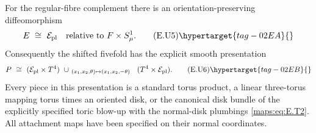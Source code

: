 \begin{proposition}
For the regular-fibre complement there is an
orientation-preserving diffeomorphism
\[
                  E\ \cong\ \mathcal E_{\rm pl}
                 \quad\hbox{relative to }F\times S^1_\mu .
 \tag{E.U5}\hypertarget{tag-02EA}{}\label{maps:eq:E.U5}
\]
Consequently the shifted fivefold has the explicit smooth
presentation
\[
 P\ \cong\
 (\mathcal E_{\rm pl}\times T^4)
 \ \cup_{\ (x_1,x_2,\theta)\mapsto(x_1,x_2,-\theta)\ }\
 (T^4\times\mathcal E_{\rm pl}).
 \tag{E.U6}\hypertarget{tag-02EB}{}\label{maps:eq:E.U6}
\]
Every piece in this presentation is a standard torus product,
a linear three-torus mapping torus times an oriented disk, or
the canonical disk bundle of the explicitly specified toric
blow-up with the normal-disk plumbings \eqref{maps:eq:E.T2}.  All attachment
maps have been specified on their normal coordinates.

\end{proposition}


